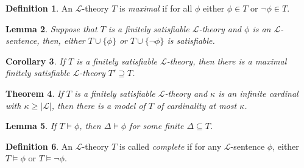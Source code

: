 \documentclass{amsart}
\newtheorem{theorem}{Theorem}[subsection]
\newtheorem{lemma}[theorem]{Lemma}
\newtheorem{corollary}[theorem]{Corollary}
\theoremstyle{definition}
\newtheorem{definition}[theorem]{Definition}
\numberwithin{equation}{section}
\begin{document}
\begin{definition}
    An $\mathcal{L}$-theory $T$ is \emph{maximal} if for all $\phi$ either $\phi \in T$ or $\neg \phi \in T$. 
\end{definition}



\begin{lemma}
    Suppose that $T$ is a finitely satisfiable $\mathcal{L}$-theory and $\phi$ is an $\mathcal{L}$-sentence, then,
    either $T \cup \{\phi\}$ or $T \cup \{\neg\phi\}$ is satisfiable.
\end{lemma}

\begin{corollary}
    If $T$ is a finitely satisfiable $\mathcal{L}$-theory,
    then there is a maximal finitely satisfiable $\mathcal{L}$-theory $T' \supseteq T$.
\end{corollary}

\begin{theorem}
    If $T$ is a finitely satisfiable $\mathcal{L}$-theory and $\kappa$ is an infinite cardinal with $\kappa \ge |\mathcal{L}|$,
    then there is a model of $T$ of cardinality at most $\kappa$. 
\end{theorem}

\begin{lemma}
    If $T \models \phi$, then $\Delta \models \phi$ for some finite $\Delta \subseteq T$.
\end{lemma}

\begin{definition}
    An $\mathcal{L}$-theory $T$ is called \emph{complete} if for any $\mathcal{L}$-sentence $\phi$,
    either $T \models \phi$ or $T \models \neg\phi$.
\end{definition}
\end{document}
